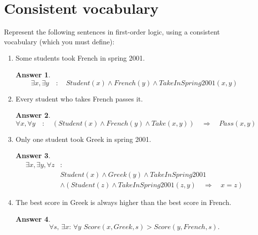 \documentclass[a4paper]{article}
\renewcommand{\(}{\left(}
\renewcommand{\)}{\right)}
\theoremstyle{plain}
\theoremstyle{plain}
\theoremstyle{definition}
\newtheorem*{answer}{Answer}
\begin{document}
\section{Consistent vocabulary}
Represent the following sentences in first-order logic, using a consistent vocabulary (which you must define):
\begin{enumerate}[label*=\alph*.,ref=\alph*]
\item Some students took French in spring 2001.
\begin{shaded}
\begin{answer}
\begin{equation*}
  \exists x , \exists y \quad : \quad Student(x) \wedge French(y) \wedge TakeInSpring2001(x,y)
\end{equation*}
\end{answer}
\end{shaded}

\item Every student who takes French passes it.
\begin{shaded}
\begin{answer}
\begin{equation*}
  \forall x , \forall y \quad : \quad \left( Student(x) \wedge French(y) \wedge Take(x,y) \right) \quad \Rightarrow \quad Pass(x,y)
\end{equation*}
\end{answer}
\end{shaded}

\item Only one student took Greek in spring 2001.
\begin{shaded}
\begin{answer}
\begin{align*}
    \exists x , \exists y , \forall z &: \\
 & Student(x) \wedge Greek(y) \wedge TakeInSpring2001 \\
 &\wedge (Student(z) \wedge TakeInSpring2001(z,y) \quad \Rightarrow \quad x = z)
\end{align*}
\end{answer}
\end{shaded}

\item The best score in Greek is always higher than the best score in French.
\begin{shaded}
\begin{answer}
\begin{equation*}
  \forall s, \, \exists x : \, \forall y \, \, Score(x,Greek, s) > Score(y,French, s).
\end{equation*}
\end{answer}
\end{shaded}


\end{enumerate}
\end{document}
